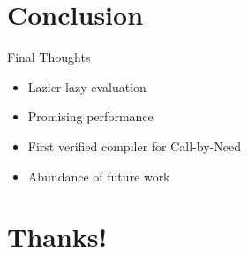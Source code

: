 \documentclass[14pt,mathserif]{beamer}
\begin{document}
\section{Conclusion}
\begin{frame}{Final Thoughts}
\begin{itemize}
\item Lazier lazy evaluation
\item Promising performance 
\item First verified compiler for Call-by-Need
\item Abundance of future work 
\end{itemize}
\end{frame}

\section{Thanks!}

%
%
\end{document}
